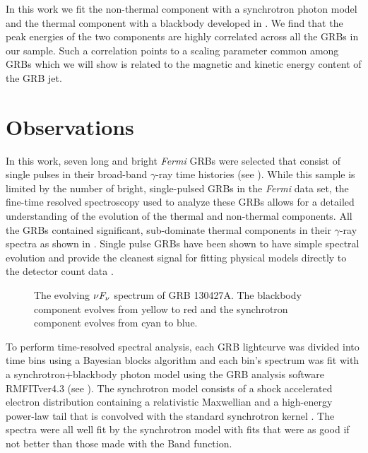 In this work we fit the non-thermal component with a synchrotron
photon model and the thermal component with a blackbody developed in
\cite{Burgess:2012,Burgess:2013}. We find that the peak energies of
the two components are highly correlated across all the GRBs in our
sample. Such a correlation points to a scaling parameter common among
GRBs which we will show is related to the magnetic and kinetic energy
content of the GRB jet.

\section{Observations}
In this work, seven long and bright {\it Fermi} GRBs were selected
that consist of single pulses in their broad-band $\gamma$-ray time
histories (see ). While this sample is limited
by the number of bright, single-pulsed GRBs in the {\it Fermi} data
set, the fine-time resolved spectroscopy used to analyze these GRBs
allows for a detailed understanding of the evolution of the thermal
and non-thermal components. All the GRBs contained significant,
sub-dominate thermal components in their $\gamma$-ray spectra as shown
in \cite{Burgess:2013,preece:2013}. Single pulse GRBs have been shown
to have simple spectral evolution and provide the cleanest signal for
fitting physical models directly to the detector count data
\cite{Burgess:2013,Burgess:2012,Ryde:2009}.

\begin{figure}[t]
  \centering
  \caption{The evolving $\nu F_{\nu}$ spectrum of GRB 130427A. The blackbody component evolves from yellow to red and the synchrotron component evolves from cyan to blue.}
  \label{fig:newSpec}
\end{figure}

To perform time-resolved spectral analysis, each GRB lightcurve was
divided into time bins using a Bayesian blocks algorithm
\cite{Scargle:2013} and each bin's spectrum was fit with a
synchrotron+blackbody photon model using the GRB analysis software
RMFITver4.3 (see ). The synchrotron model consists of a
shock accelerated electron distribution containing a relativistic
Maxwellian and a high-energy power-law tail that is convolved with the
standard synchrotron kernel
\cite{Burgess:2013,Burgess:2012,rybicki:1979}. The spectra were all
well fit by the synchrotron model with fits that were as good if not
better than those made with the Band function.



